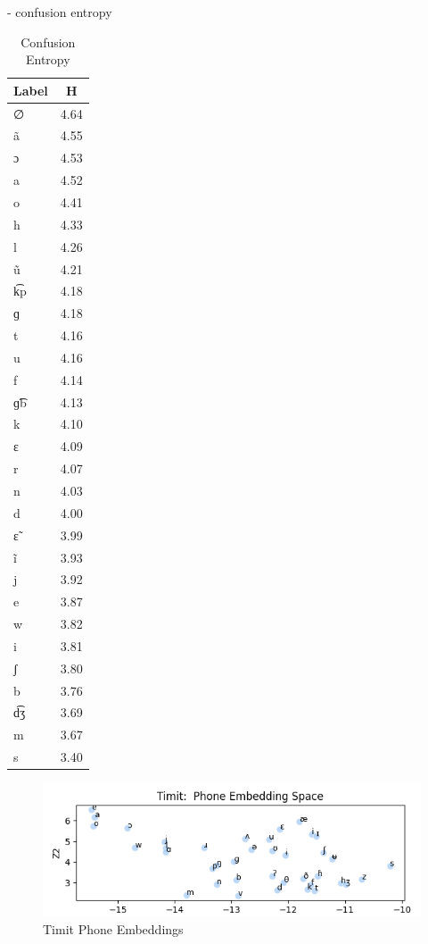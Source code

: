 \documentclass[11pt]{article}
\newcommand{\ipa}[1]{{\ipafont #1}}
\begin{document}
{- confusion entropy
\begin{table}[h!]
\centering
\caption{Confusion Entropy}
\begin{tabular}{lc}
\toprule
\textbf{Label} & \textbf{H} \\
\midrule
\ipa{∅}    & 4.64 \\
\ipa{ã}   & 4.55 \\
\ipa{ɔ}    & 4.53 \\
\ipa{a}    & 4.52 \\
\ipa{o}    & 4.41 \\
\ipa{h}    & 4.33 \\
\ipa{l}    & 4.26 \\
\ipa{ũ}   & 4.21 \\
\ipa{k͡p}  & 4.18 \\
\ipa{ɡ}    & 4.18 \\
\ipa{t}    & 4.16 \\
\ipa{u}    & 4.16 \\
\ipa{f}    & 4.14 \\
\ipa{ɡ͡b}  & 4.13 \\
\ipa{k}    & 4.10 \\
\ipa{ɛ}    & 4.09 \\
\ipa{r}    & 4.07 \\
\ipa{n}    & 4.03 \\
\ipa{d}    & 4.00 \\
\ipa{ɛ̃}   & 3.99 \\
\ipa{ĩ}   & 3.93 \\
\ipa{j}    & 3.92 \\
\ipa{e}    & 3.87 \\
\ipa{w}    & 3.82 \\
\ipa{i}    & 3.81 \\
\ipa{ʃ}    & 3.80 \\
\ipa{b}    & 3.76 \\
\ipa{d͡ʒ}  & 3.69 \\
\ipa{m}    & 3.67 \\
\ipa{s}    & 3.40 \\
\bottomrule
\end{tabular}
\end{table}

\begin{figure}
    \centering
    \includegraphics[width=1\linewidth]{timitultphone.png}
    \caption{Timit Phone Embeddings}
    \label{fig:placeholder}
\end{figure}

}
\end{document}
